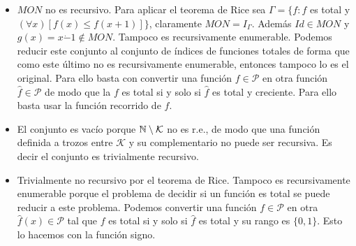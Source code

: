 \documentclass[twoside]{article}
\begin{document}
\begin{solucion}
\begin{itemize}
	\item $MON$ no es recursivo. Para aplicar el teorema de Rice sea $\Gamma=\{f: f$ es total y $(\forall x)[f(x)\leq f(x+1)]\}$, claramente $MON=I_\Gamma$. Además $Id\in MON$ y $g(x)=x\dot{-}1\notin MON$. Tampoco es recursivamente enumerable. Podemos reducir este conjunto al conjunto de índices de funciones totales de forma que como este último no es recursivamente enumerable, entonces tampoco lo es el original. Para ello basta con convertir una función $f\in\mathcal{P}$ en otra función $\hat{f}\in\mathcal{P}$ de modo que la $f$ es total si y solo si $\hat{f}$ es total y creciente. Para ello basta usar la función recorrido de $f$. 
	\item El conjunto es vacío porque $\mathbb{N}\setminus\mathcal{K}$ no es r.e., de modo que una función definida a trozos entre $\mathcal{K}$ y su complementario no puede ser recursiva. Es decir el conjunto es trivialmente recursivo.
	\item Trivialmente no recursivo por el teorema de Rice. Tampoco es recursivamente enumerable porque el problema de decidir si un función es total se puede reducir a este problema. Podemos convertir una función $f\in\mathcal{P}$ en otra $\hat{f}(x)\in\mathcal{P}$ tal que $f$ es total si y solo si $\hat{f}$ es total y su rango es $\{0,1\}$. Esto lo hacemos con la función signo.
\end{itemize}
\end{solucion}
\end{document}
